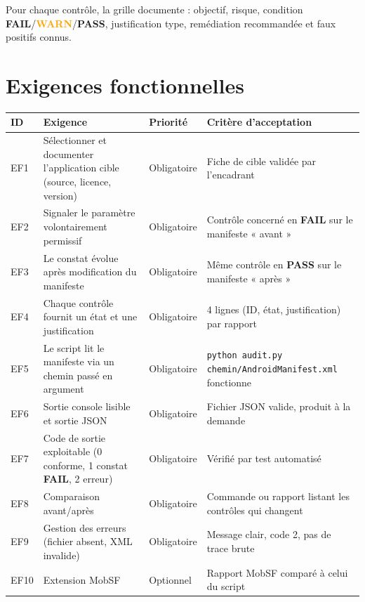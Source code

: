 \documentclass[11pt,a4paper]{article}
\newcommand{\code}[1]{{\NoAutoSpacing\texttt{\small #1}}}
\newcommand{\code}[1]{{\texttt{\small #1}}}
\newcommand{\PASS}{\textbf{\textcolor{vert}{PASS}}}
\newcommand{\FAIL}{\textbf{\textcolor{rouge}{FAIL}}}
\newcommand{\WARN}{\textbf{\textcolor{orange}{WARN}}}
\begin{document}
Pour chaque contrôle, la grille documente : objectif, risque, condition \FAIL{}/\WARN{}/\PASS{}, justification type, remédiation recommandée et faux positifs connus.

\section{Exigences fonctionnelles}
\begin{longtable}{@{}L{1.1cm}L{5.9cm}L{2.1cm}L{4.5cm}@{}}
\color{white}\bfseries ID & \color{white}\bfseries Exigence & \color{white}\bfseries Priorité & \color{white}\bfseries Critère d'acceptation\\
\endhead
EF1 & Sélectionner et documenter l'application cible (source, licence, version) & Obligatoire & Fiche de cible validée par l'encadrant\\
EF2 & Signaler le paramètre volontairement permissif & Obligatoire & Contrôle concerné en \FAIL{} sur le manifeste « avant »\\
EF3 & Le constat évolue après modification du manifeste & Obligatoire & Même contrôle en \PASS{} sur le manifeste « après »\\
EF4 & Chaque contrôle fournit un état et une justification & Obligatoire & 4 lignes (ID, état, justification) par rapport\\
EF5 & Le script lit le manifeste via un chemin passé en argument & Obligatoire & \code{python audit.py chemin/AndroidManifest.xml} fonctionne\\
EF6 & Sortie console lisible et sortie JSON & Obligatoire & Fichier JSON valide, produit à la demande\\
EF7 & Code de sortie exploitable (0 conforme, 1 constat \FAIL{}, 2 erreur) & Obligatoire & Vérifié par test automatisé\\
EF8 & Comparaison avant/après & Obligatoire & Commande ou rapport listant les contrôles qui changent\\
EF9 & Gestion des erreurs (fichier absent, XML invalide) & Obligatoire & Message clair, code 2, pas de trace brute\\
EF10 & Extension MobSF & Optionnel & Rapport MobSF comparé à celui du script\\
\end{longtable}

\end{document}
